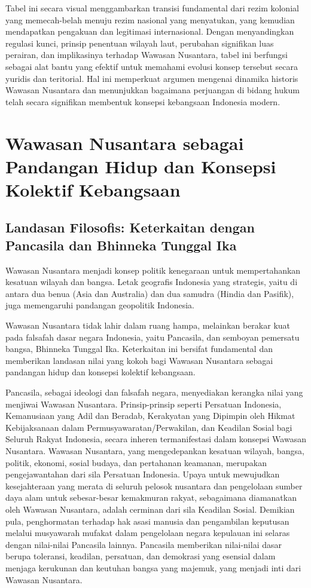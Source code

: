 \documentclass[12pt, a4paper]{article}
\begin{document}
Tabel ini secara visual menggambarkan transisi fundamental dari rezim kolonial yang memecah-belah menuju rezim nasional yang menyatukan, yang kemudian mendapatkan pengakuan dan legitimasi internasional. Dengan menyandingkan regulasi kunci, prinsip penentuan wilayah laut, perubahan signifikan luas perairan, dan implikasinya terhadap Wawasan Nusantara, tabel ini berfungsi sebagai alat bantu yang efektif untuk memahami evolusi konsep tersebut secara yuridis dan teritorial. Hal ini memperkuat argumen mengenai dinamika historis Wawasan Nusantara dan menunjukkan bagaimana perjuangan di bidang hukum telah secara signifikan membentuk konsepsi kebangsaan Indonesia modern.
\section{Wawasan Nusantara sebagai Pandangan Hidup dan Konsepsi Kolektif Kebangsaan}
\subsection*{Landasan Filosofis: Keterkaitan dengan Pancasila dan Bhinneka Tunggal Ika}
Wawasan Nusantara menjadi konsep politik kenegaraan untuk mempertahankan kesatuan wilayah dan bangsa. Letak geografis Indonesia yang strategis, yaitu di antara dua benua (Asia dan Australia) dan dua samudra (Hindia dan Pasifik), juga memengaruhi pandangan geopolitik Indonesia.

Wawasan Nusantara tidak lahir dalam ruang hampa, melainkan berakar kuat pada falsafah dasar negara Indonesia, yaitu Pancasila, dan semboyan pemersatu bangsa, Bhinneka Tunggal Ika. Keterkaitan ini bersifat fundamental dan memberikan landasan nilai yang kokoh bagi Wawasan Nusantara sebagai pandangan hidup dan konsepsi kolektif kebangsaan.

Pancasila, sebagai ideologi dan falsafah negara, menyediakan kerangka nilai yang menjiwai Wawasan Nusantara. Prinsip-prinsip seperti Persatuan Indonesia, Kemanusiaan yang Adil dan Beradab, Kerakyatan yang Dipimpin oleh Hikmat Kebijaksanaan dalam Permusyawaratan/Perwakilan, dan Keadilan Sosial bagi Seluruh Rakyat Indonesia, secara inheren termanifestasi dalam konsepsi Wawasan Nusantara. Wawasan Nusantara, yang mengedepankan kesatuan wilayah, bangsa, politik, ekonomi, sosial budaya, dan pertahanan keamanan, merupakan pengejawantahan dari sila Persatuan Indonesia. Upaya untuk mewujudkan kesejahteraan yang merata di seluruh pelosok nusantara dan pengelolaan sumber daya alam untuk sebesar-besar kemakmuran rakyat, sebagaimana diamanatkan oleh Wawasan Nusantara, adalah cerminan dari sila Keadilan Sosial. Demikian pula, penghormatan terhadap hak asasi manusia dan pengambilan keputusan melalui musyawarah mufakat dalam pengelolaan negara kepulauan ini selaras dengan nilai-nilai Pancasila lainnya. Pancasila memberikan nilai-nilai dasar berupa toleransi, keadilan, persatuan, dan demokrasi yang esensial dalam menjaga kerukunan dan keutuhan bangsa yang majemuk, yang menjadi inti dari Wawasan Nusantara.  
\end{document}
